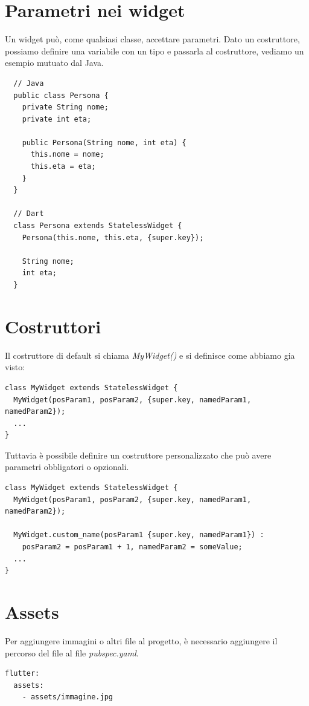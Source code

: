 \documentclass[12pt]{article}
\begin{document}
\section{Parametri nei widget}
Un widget può, come qualsiasi classe, accettare parametri.
Dato un costruttore, possiamo definire una variabile
con un tipo e passarla al costruttore, vediamo
un esempio mutuato dal Java.

\begin{highlight}
\begin{verbatim}
  // Java
  public class Persona {
    private String nome;
    private int eta;

    public Persona(String nome, int eta) {
      this.nome = nome;
      this.eta = eta;
    }
  }

  // Dart
  class Persona extends StatelessWidget {
    Persona(this.nome, this.eta, {super.key});

    String nome;
    int eta;
  }
\end{verbatim}
\end{highlight}


\section{Costruttori}
Il costruttore di default si chiama \textit{MyWidget()}
e si definisce come abbiamo gia visto:
\begin{highlight}
\begin{verbatim}
class MyWidget extends StatelessWidget {
  MyWidget(posParam1, posParam2, {super.key, namedParam1, namedParam2});
  ...
}
\end{verbatim}
\end{highlight}

Tuttavia è possibile definire un costruttore personalizzato
che può avere parametri obbligatori o opzionali.

\begin{highlight}
\begin{verbatim}
class MyWidget extends StatelessWidget {
  MyWidget(posParam1, posParam2, {super.key, namedParam1, namedParam2});

  MyWidget.custom_name(posParam1 {super.key, namedParam1}) :
    posParam2 = posParam1 + 1, namedParam2 = someValue;
  ...
}
\end{verbatim}
\end{highlight}

\section{Assets}
Per aggiungere immagini o altri file al progetto, è necessario
aggiungere il percorso del file al file \textit{pubspec.yaml}.
\begin{highlight}
\begin{verbatim}
flutter:
  assets:
    - assets/immagine.jpg
\end{verbatim}
\end{highlight}
\end{document}
